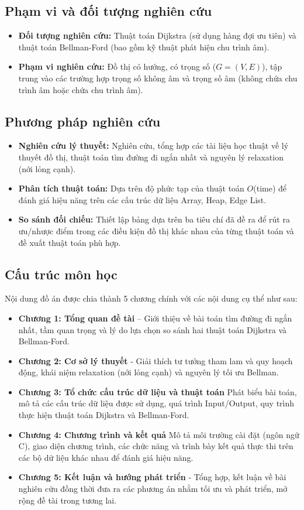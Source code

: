 \documentclass[14pt,a4paper]{report}
\begin{document}
\subsection{Phạm vi và đối tượng nghiên cứu}
\begin{itemize}
    \item \textbf{Đối tượng nghiên cứu: } Thuật toán Dijkstra (sử dụng hàng đợi ưu tiên) và thuật toán Bellman-Ford (bao gồm kỹ thuật phát hiện chu trình âm).
    \item \textbf{Phạm vi nghiên cứu: } Đồ thị có hướng, có trọng số ($G = (V, E)$), tập trung vào các trường hợp trọng số không âm và trọng số âm (không chứa chu trình âm hoặc chứa chu trình âm).
\end{itemize}

\subsection{Phương pháp nghiên cứu}
\begin{itemize}
    \item \textbf{Nghiên cứu lý thuyết: } Nghiên cứu, tổng hợp các tài liệu học thuật về lý thuyết đồ thị, thuật toán tìm đường đi ngắn nhất và nguyên lý relaxation (nới lỏng cạnh).
    \item \textbf{Phân tích thuật toán: } Dựa trên độ phức tạp của thuật toán $O$(time) để đánh giá hiệu năng trên các cấu trúc dữ liệu Array, Heap, Edge List.
    \item \textbf{So sánh đối chiếu: } Thiết lập bảng dựa trên ba tiêu chí đã đề ra để rút ra ưu/nhược điểm trong các điều kiện đồ thị khác nhau của từng thuật toán và đề xuất thuật toán phù hợp.
\end{itemize}

\subsection{Cấu trúc môn học}
\fontsize{12pt}{13pt}\selectfont
Nội dung đồ án được chia thành 5 chương chính với các nội dung cụ thể như sau:
\begin{itemize}
    \item \textbf{Chương 1: Tổng quan đề tài} – Giới thiệu về bài toán tìm đường đi ngắn nhất, tầm quan trọng và lý do lựa chọn so sánh hai thuật toán Dijkstra và Bellman-Ford.
    \item \textbf{Chương 2: Cơ sở lý thuyết} - Giải thích tư tưởng tham lam và quy hoạch động, khái niệm relaxation (nới lỏng cạnh) và nguyên lý tối ưu Bellman.
    \item \textbf{Chương 3: Tổ chức cấu trúc dữ liệu và thuật toán} Phát biểu bài toán, mô tả các cấu trúc dữ liệu được sử dụng, quá trình Input/Output, quy trình thực hiện thuật toán Dijkstra và Bellman-Ford.
    \item \textbf{Chương 4: Chương trình và kết quả} Mô tả môi trường cài đặt (ngôn ngữ C), giao diện chương trình, các chức năng và trình bày kết quả thực thi trên các bộ dữ liệu khác nhau để đánh giá hiệu năng.
    \item \textbf{Chương 5: Kết luận và hướng phát triển} - Tổng hợp, kết luận về bài nghiên cứu đồng thời đưa ra các phương án nhằm tối ưu và phát triển, mở rộng đề tài trong tương lai.
\end{itemize}
\end{document}
